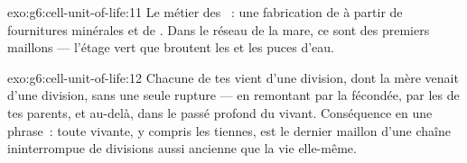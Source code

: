 \begin{solution}{exo:g6:cell-unit-of-life:11}
Le métier des ~: une fabrication  de  à partir de fournitures minérales et de . Dans le
réseau de la mare, ce sont des premiers maillons --- l'étage vert
que broutent les  et les puces d'eau.
\end{solution}

\begin{solution}{exo:g6:cell-unit-of-life:12}
Chacune de tes  vient d'une division, dont la  mère
venait d'une division, sans une seule rupture --- en remontant par
la  fécondée, par les  de tes parents, et
au-delà, dans le passé profond du vivant. Conséquence en une
phrase~: toute  vivante, y compris les tiennes, est le
dernier maillon d'une chaîne ininterrompue de divisions aussi
ancienne que la vie elle-même.
\end{solution}

